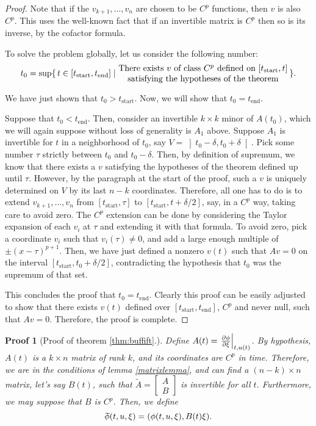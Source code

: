 \documentclass{article}
\theoremstyle{plain}
\theoremstyle{plain}
\theoremstyle{nonumberplain}
\newtheorem{proof}{Proof}
\theoremstyle{empty}
\newtheorem{proofref}{Proof}
\newcommand{\tstart}{\mathrm{start}}
\newcommand{\tend}{\mathrm{end}}
\newcommand{\wtphi}{
  \mspace{2mu}
  \widetilde{\mspace{-2mu}\smash[t]{\phi}}
}
\DeclarePairedDelimiter\eval{.}{\rvert}
\begin{document}
\begin{appendices}
\begin{proof}
Note that if the $v_{k+1}, \dots, v_n$ are chosen to be $C^p$ functions, then $v$ is also $C^p$. This uses the well-known fact that if an invertible matrix is $C^p$ then so is its inverse, by the cofactor formula.

To solve the problem globally, let us consider the following number:
\[t_0 = \sup \{\, t \in [t_\tstart, t_\tend] \mid \parbox{7cm}{\centering There exists $v$ of class $C^p$ defined on $[t_\tstart, t]$ satisfying the hypotheses of the theorem}\,\}.\]

We have just shown that $t_0 > t_\tstart$. Now, we will show that $t_0 = t_\tend$.

Suppose that $t_0 < t_\tend$. Then, consider an invertible $k \times k$ minor of $A(t_0)$, which we will again suppose without loss of generality is $A_1$ above. Suppose $A_1$ is invertible for $t$ in a neighborhood of $t_0$, say $V = \left]t_0 - \delta, t_0 + \delta\right[$. Pick some number $\tau$ strictly between $t_0$ and $t_0 - \delta$. Then, by definition of supremum, we know that there exists a $v$ satisfying the hypotheses of the theorem defined up until $\tau$. However, by the paragraph at the start of the proof, such a $v$ is uniquely determined on $V$ by its last $n-k$ coordinates. Therefore, all one has to do is to extend $v_{k+1}, \dots, v_n$ from $[t_\tstart, \tau]$ to $[t_\tstart, t+\delta/2]$, say, in a $C^p$ way, taking care to avoid zero. The $C^p$ extension can be done by considering the Taylor expansion of each $v_i$ at $\tau$ and extending it with that formula. To avoid zero, pick a coordinate $v_i$ such that $v_i(\tau) \neq 0$, and add a large enough multiple of $\pm (x-\tau)^{p+1}$. Then, we have just defined a nonzero $v(t)$ such that $Av=0$ on the interval $[t_\tstart, t_0 + \delta/2]$, contradicting the hypothesis that $t_0$ was the supremum of that set.

This concludes the proof that $t_0 = t_\tend$. Clearly this proof can be easily adjusted to show that there exists $v(t)$ defined over $[t_\tstart, t_\tend]$, $C^p$ and never null, such that $Av = 0$. Therefore, the proof is complete.
\end{proof}

\begin{proofref}[Proof of theorem \ref{thm:buffift}.]
Define $A(t) = \eval*{\diffp \phi \xi}_{t,u(t)}$. By hypothesis, $A(t)$ is a $k \times n$ matrix of rank $k$, and its coordinates are $C^p$ in time. Therefore, we are in the conditions of lemma \ref{matrixlemma}, and can find a $(n-k) \times n$ matrix, let's say $B(t)$, such that $\tilde A = \begin{bmatrix}A\\B\end{bmatrix}$ is invertible for all $t$. Furthermore, we may suppose that $B$ is $C^p$. Then, we define
\[\wtphi(t,u,\xi) = (\phi(t,u,\xi), B(t) \xi).\]


\end{proofref}
\end{appendices}
\end{document}
